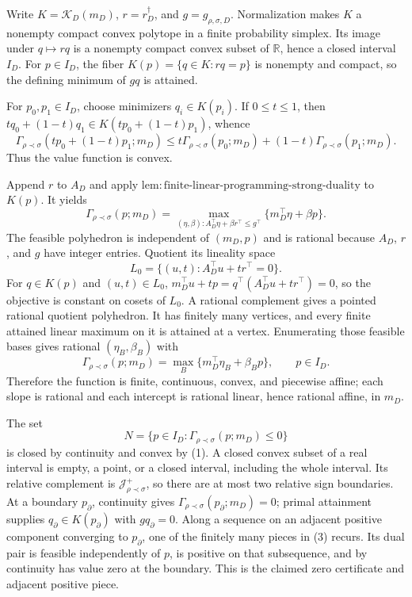 Write \(K=\mathcal K_D(m_D)\), \(r=r_D^\dagger\), and \(g=g_{\rho,\sigma,D}\).  Normalization makes \(K\) a nonempty compact convex polytope in a finite probability simplex.  Its image under \(q\mapsto rq\) is a nonempty compact convex subset of \(\mathbb R\), hence a closed interval \(I_D\).  For \(p\in I_D\), the fiber \(K(p)=\{q\in K:rq=p\}\) is nonempty and compact, so the defining minimum of \(gq\) is attained.

For \(p_0,p_1\in I_D\), choose minimizers \(q_i\in K(p_i)\).  If \(0\leq t\leq1\), then \(tq_0+(1-t)q_1\in K(tp_0+(1-t)p_1)\), whence
\[
\Gamma_{\rho\prec\sigma}(tp_0+(1-t)p_1;m_D)
\leq t\Gamma_{\rho\prec\sigma}(p_0;m_D)
+(1-t)\Gamma_{\rho\prec\sigma}(p_1;m_D).
\tag{1}
\]
Thus the value function is convex.

Append \(r\) to \(A_D\) and apply \(\mathrm{lem:finite\text{-}linear\text{-}programming\text{-}strong\text{-}duality}\) to \(K(p)\).  It yields
\[
\Gamma_{\rho\prec\sigma}(p;m_D)
=\max_{(\eta,\beta):A_D^\top\eta+\beta r^\top\leq g^\top}
\{m_D^\top\eta+\beta p\}.
\tag{2}
\]
The feasible polyhedron is independent of \((m_D,p)\) and is rational because \(A_D\), \(r\), and \(g\) have integer entries.  Quotient its lineality space
\[
L_0=\{(u,t):A_D^\top u+t r^\top=0\}.
\]
For \(q\in K(p)\) and \((u,t)\in L_0\),
\(m_D^\top u+tp=q^\top(A_D^\top u+t r^\top)=0\), so the objective is constant on cosets of \(L_0\).  A rational complement gives a pointed rational quotient polyhedron.  It has finitely many vertices, and every finite attained linear maximum on it is attained at a vertex.  Enumerating those feasible bases gives rational \((\eta_B,\beta_B)\) with
\[
\Gamma_{\rho\prec\sigma}(p;m_D)
=\max_B\{m_D^\top\eta_B+\beta_Bp\},
\qquad p\in I_D.
\tag{3}
\]
Therefore the function is finite, continuous, convex, and piecewise affine; each slope is rational and each intercept is rational linear, hence rational affine, in \(m_D\).

The set
\[
N=\{p\in I_D:\Gamma_{\rho\prec\sigma}(p;m_D)\leq0\}
\]
is closed by continuity and convex by (1).  A closed convex subset of a real interval is empty, a point, or a closed interval, including the whole interval.  Its relative complement is \(\mathcal J_{\rho\prec\sigma}^+\), so there are at most two relative sign boundaries.  At a boundary \(p_\partial\), continuity gives \(\Gamma_{\rho\prec\sigma}(p_\partial;m_D)=0\); primal attainment supplies \(q_\partial\in K(p_\partial)\) with \(gq_\partial=0\).  Along a sequence on an adjacent positive component converging to \(p_\partial\), one of the finitely many pieces in (3) recurs.  Its dual pair is feasible independently of \(p\), is positive on that subsequence, and by continuity has value zero at the boundary.  This is the claimed zero certificate and adjacent positive piece.

